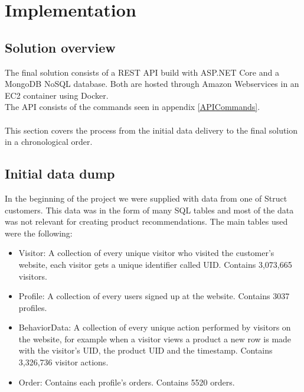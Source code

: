 
\chapter{Implementation} %

\label{Chapter5} %


\section{Solution overview}

The final solution consists of a \gls{REST} API build with ASP.NET Core and a MongoDB \gls{NoSQL} database. Both are hosted through Amazon Webservices in an EC2 container using Docker. \\
The API consists of the commands seen in appendix \ref{APICommands}. \\\\

This section covers the process from the initial data delivery to the final solution in a chronological order.

\section{Initial data dump}
In the beginning of the project we were supplied with data from one of \gls{Struct} customers. This data was in the form of many SQL tables and most of the data was not relevant for creating product recommendations. The main tables used were the following:  \\
\begin{itemize}
\item Visitor: A collection of every unique visitor who visited the customer's website, each visitor gets a unique identifier called UID. Contains 3,073,665  visitors.
\item Profile: A collection of every users signed up at the website. Contains 3037 profiles.
\item BehaviorData: A collection of every unique action performed by visitors on the website, for example when a visitor views a product a new row is made with the visitor's UID, the product UID and the timestamp. Contains 3,326,736 visitor actions.
\item Order: Contains each profile's orders. Contains 5520 orders.
\end{itemize}

